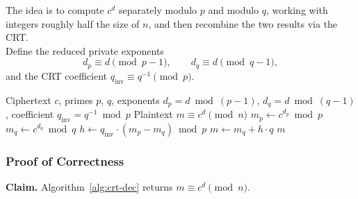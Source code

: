 The idea is to compute $c^d$ separately modulo $p$ and modulo $q$, working with integers
roughly half the size of $n$, and then recombine the two results via the CRT. \\ Define the
reduced private exponents
\[
  d_p \equiv d \pmod{p-1}, \qquad d_q \equiv d \pmod{q-1},
\]
and the CRT coefficient $q_{\text{inv}} \equiv q^{-1} \pmod{p}$.
\begin{algorithm}[H]
\caption{Fast RSA Decryption via CRT (Garner's Method)}
\label{alg:crt-dec}
\begin{algorithmic}
\Require Ciphertext $c$, primes $p$, $q$, exponents $d_p = d \bmod (p-1)$,
         $d_q = d \bmod (q-1)$, coefficient $q_{\text{inv}} = q^{-1} \bmod p$
\Ensure Plaintext $m \equiv c^d \pmod{n}$
\State $m_p \leftarrow c^{d_p} \bmod p$ 
\State $m_q \leftarrow c^{d_q} \bmod q$ 
\State $h \leftarrow q_{\text{inv}} \cdot (m_p - m_q) \bmod p$ 
\State $m \leftarrow m_q + h \cdot q$
\State \Return $m$
\end{algorithmic}
\end{algorithm}
\subsubsection*{Proof of Correctness}

\textbf{Claim.}
Algorithm~\ref{alg:crt-dec} returns $m \equiv c^d \pmod{n}$.

